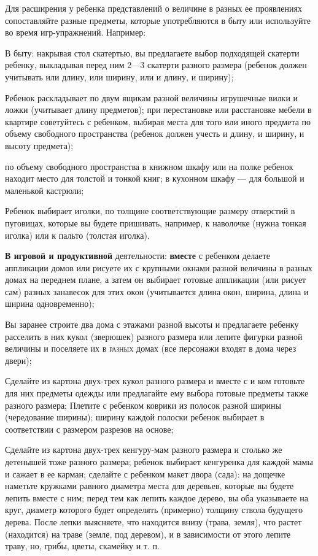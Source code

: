 \documentclass{book}
\begin{document}
Для расширения у ребенка представлений о величине в разных ее
проявлениях сопоставляйте разные предметы, которые употребляются в быту
или используйте во время игр-упражнений. Например:

В быту: накрывая стол скатертью, вы предлагаете выбор подходящей
скатерти ребенку, выкладывая перед ним 2---3 скатерти разного размера
(ребенок должен учитывать или длину, или ширину, или и длину, и ширину);

Ребенок раскладывает по двум ящикам разной величины игрушечные вилки и
ложки (учитывает длину предметов); при перестановке или расстановке
мебели в квартире советуйтесь с ребенком, выбирая места для того или
иного предмета по объему свободного пространства (ребенок должен учесть
и длину, и ширину, и высоту предмета);

по объему свободного пространства в книжном шкафу или на полке ребенок
находит место для толстой и тонкой книг; в кухонном шкафу --- для
большой и маленькой кастрюли;

Ребенок выбирает иголки, по толщине соответствующие размеру отверстий в
пуговицах, которые вы будете пришивать, например, к наволочке (нужна
тонкая иголка) или к пальто (толстая иголка).

\textbf{В игровой и продуктивной} деятельности: \textbf{вместе} с
ребенком делаете аппликации домов или рисуете их с крупными окнами
разной величины в разных домах на переднем плане, а затем он выбирает
готовые аппликации (или рисует сам) разных занавесок для этих окон
(учитывается длина окон, ширина, длина и ширина одновременно);

Вы заранее строите два дома с этажами разной высоты и предлагаете
ребенку расселить в них кукол (зверюшек) разного размера или лепите
фигурки разной величины и поселяете их в \textsc{разных} домах (все
персонажи входят в дома через двери);

Сделайте из картона двух-трех кукол разного размера и вместе с и ком
готовьте для них предметы одежды или предлагайте ему выбора готовые
предметы также разного размера; Плетите с ребенком коврики из полосок
разной ширины (чередование ширины); ширину каждой полоски ребенок
выбирает в соответствии с размером разрезов на основе;

Сделайте из картона двух-трех кенгуру-мам разного размера и столько же
детенышей тоже разного размера; ребенок выбирает кенгуренка для каждой
мамы и сажает в ее карман; сделайте с ребенком макет двора (сада): на
дощечке наметьте кружками равного диаметра места для деревьев, которые
вы будете лепить вместе с ним; перед тем как лепить каждое дерево, вы
оба указываете на круг, диаметр которого будет определять (примерно)
толщину ствола будущего дерева. После лепки выясняете, что находится
внизу (трава, земля), что растет (находится) на траве (земле, под
деревом), и в зависимости от этого лепите траву, но, грибы, цветы,
скамейку и т. п.
\end{document}
